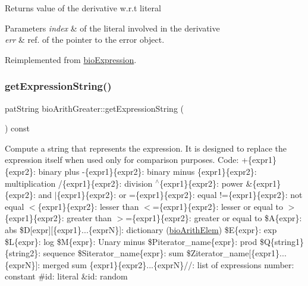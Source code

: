 \begin{DoxyReturn}{Returns}
value of the derivative w.\+r.\+t literal 
\end{DoxyReturn}

\begin{DoxyParams}{Parameters}
{\em index} & of the literal involved in the derivative \\
\hline
{\em err} & ref. of the pointer to the error object. \\
\hline
\end{DoxyParams}


Reimplemented from \hyperlink{classbio_expression_a5915579d1193f25f216c1e273c97f2ce}{bio\+Expression}.

\mbox{\label{classbio_arith_greater_a391651a15d94bbb1cba7bbf74937d3bd}} 
\subsubsection{\texorpdfstring{get\+Expression\+String()}{getExpressionString()}}
{\footnotesize\ttfamily pat\+String bio\+Arith\+Greater\+::get\+Expression\+String (\begin{DoxyParamCaption}{ }\end{DoxyParamCaption}) const\hspace{0.3cm}{\ttfamily [virtual]}}

Compute a string that represents the expression. It is designed to replace the expression itself when used only for comparison purposes. Code\+: +\{expr1\}\{expr2\}\+: binary plus -\/\{expr1\}\{expr2\}\+: binary minus \{expr1\}\{expr2\}\+: multiplication /\{expr1\}\{expr2\}\+: division $^\wedge$\{expr1\}\{expr2\}\+: power \&\{expr1\}\{expr2\}\+: and $\vert$\{expr1\}\{expr2\}\+: or =\{expr1\}\{expr2\}\+: equal !=\{expr1\}\{expr2\}\+: not equal $<$\{expr1\}\{expr2\}\+: lesser than $<$=\{expr1\}\{expr2\}\+: lesser or equal to $>$\{expr1\}\{expr2\}\+: greater than $>$=\{expr1\}\{expr2\}\+: greater or equal to \$A\{expr\}\+: abs \$D\mbox{[}expr\mbox{]}\mbox{[}\{expr1\}...\{exprN\}\mbox{]}\+: dictionary (\hyperlink{classbio_arith_elem}{bio\+Arith\+Elem}) \$E\{expr\}\+: exp \$L\{expr\}\+: log \$M\{expr\}\+: Unary minus \$\+Piterator\+\_\+name\{expr\}\+: prod \$Q\{string1\}\{string2\}\+: sequence \$\+Siterator\+\_\+name\{expr\}\+: sum \$\+Ziterator\+\_\+name\mbox{[}\{expr1\}...\{exprN\}\mbox{]}\+: merged sum \{expr1\}\{expr2\}...\{exprN\}//\+: list of expressions number\+: constant \#id\+: literal \&id\+: random 

